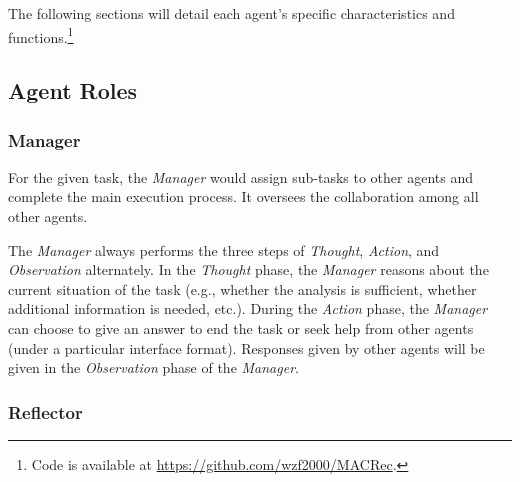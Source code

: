 The following sections will detail each agent's specific characteristics and functions.\footnote{Code is available at \href{https://github.com/wzf2000/MACRec}{https://github.com/wzf2000/MACRec}.}




\subsection{Agent Roles}

\subsubsection{\textbf{Manager}}
For the given task, the \textsl{Manager} would assign sub-tasks to other agents and complete the main execution process. It oversees the collaboration among all other agents. %

The \textsl{Manager} always performs the three steps of \textsl{Thought}, \textsl{Action}, and \textsl{Observation} alternately.
In the \textsl{Thought} phase, the \textsl{Manager} reasons about the current situation of the task (e.g., whether the analysis is sufficient, whether additional information is needed, etc.).
During the \textsl{Action} phase, the \textsl{Manager} can choose to give an answer to end the task or seek help from other agents (under a particular interface format).
Responses given by other agents will be given in the \textsl{Observation} phase of the \textsl{Manager}.

\subsubsection{\textbf{Reflector}}

